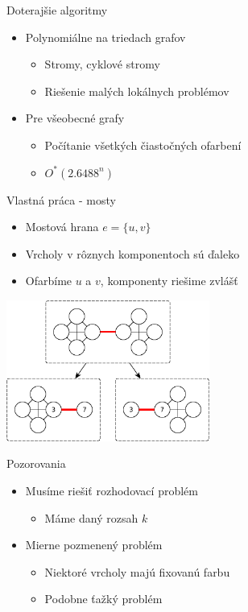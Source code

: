 \documentclass[slovak]{beamer}
\begin{document}
\begin{frame}{Doterajšie algoritmy}
    \begin{itemize}
        \item Polynomiálne na triedach grafov
        \begin{itemize}
            \item Stromy, cyklové stromy
            \item Riešenie malých lokálnych problémov
        \end{itemize}
        \item Pre všeobecné grafy
        \begin{itemize}
            \item Počítanie všetkých čiastočných ofarbení
            \item $O^*(2.6488^n)$
        \end{itemize}
    \end{itemize}
\end{frame}

\begin{frame}{Vlastná práca - mosty}
    \begin{itemize}
        \item Mostová hrana $e = \{u,v\}$
        \item Vrcholy v rôznych komponentoch sú ďaleko
        \item Ofarbíme $u$ a $v$, komponenty riešime zvlášť
    \end{itemize}
    \begin{center}
        \includegraphics[width=0.5\textwidth]{grafy/bridgesplit.pdf}
    \end{center}
\end{frame}

\begin{frame}{Pozorovania}
    \begin{itemize}
        \item Musíme riešiť rozhodovací problém
        \begin{itemize}
            \item Máme daný rozsah $k$
        \end{itemize}
        \item Mierne pozmenený problém
        \begin{itemize}
            \item Niektoré vrcholy majú fixovanú farbu
            \item Podobne ťažký problém
        \end{itemize}
    \end{itemize}
\end{frame}
\end{document}
